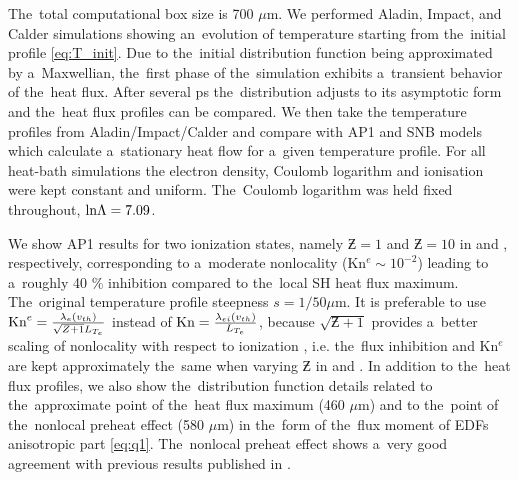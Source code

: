 The~total computational box size is 700 $\mu$m.
We performed Aladin, Impact, and Calder simulations showing an~evolution of
temperature starting from the~initial profile \eqref{eq:T_init}. 
Due to the~initial distribution function being approximated by a~Maxwellian,
the~first phase of the~simulation exhibits a~transient behavior of the~heat
flux. After several ps the~distribution adjusts to its asymptotic form
and the~heat flux profiles can be compared. 
We then take the temperature profiles from Aladin/Impact/Calder and compare 
with AP1 and SNB models which calculate a~stationary heat flow
for a~given temperature profile. 
For all heat-bath simulations the electron density, Coulomb logarithm and 
ionisation were kept constant and uniform.
The~Coulomb logarithm was held fixed throughout, $\text{ln}\Lambda = 7.09$.

We show AP1 results for two ionization states, namely $\Zbar = 1$ and 
$\Zbar = 10$ 
in  and , 
respectively, corresponding to a~moderate nonlocality 
(Kn$^e \sim 10^{-2}$) leading to a~roughly 40 $\%$ inhibition compared 
to the~local SH heat flux maximum. The~original temperature profile steepness
$s = 1/50 \mu$m.
It is preferable to use 
$\text{Kn}^e = \frac{\lambda_e(v_{th})}{\sqrt{Z + 1}L_{T_e}}$ instead of
 $\text{Kn} = \frac{\lambda_{ei}(v_{th})}{L_{T_e}}$, 
because $\sqrt{\Zbar + 1}$ provides 
a~better scaling of nonlocality with respect
to ionization \cite{LMV_1983_7}, i.e. the~flux inhibition and Kn$^e$ are
kept approximately the~same when varying $\Zbar$ in 
 and .
In addition to the~heat flux profiles, we also show the~distribution function 
details related to the~approximate point of the~heat flux maximum (460 $\mu$m) 
and to the~point of the~nonlocal preheat effect (580 $\mu$m) in the~form of
the~flux moment of EDFs anisotropic part \eqref{eq:q1}.
The~nonlocal preheat effect shows a~very good agreement with 
previous results published in \cite{Sherlock_PoP2017}.


